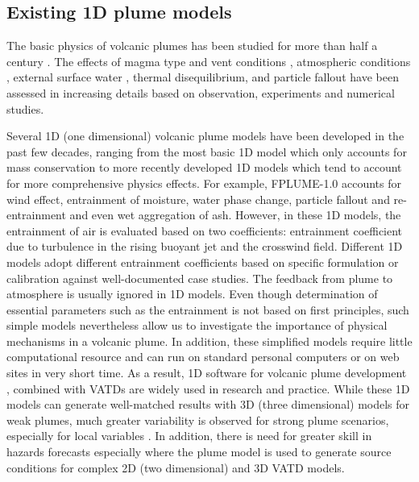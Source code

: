 \subsection{Existing 1D plume models}
The basic physics of volcanic plumes has been studied for more than half a century \citep{morton1956turbulent, settle1978volcanic, wilson1978control}. The effects of magma type and vent conditions \citep{woods1988fluid, woods1995decompression}, atmospheric conditions \citep{ woods1993moist, sparks1997volcanic, bursik2001effect}, external surface water \citep{koyaguchi1996formation}, thermal disequilibrium, and particle fallout \citep{woods1991particle} have been assessed in increasing details based on observation, experiments and numerical studies.

Several 1D (one dimensional) volcanic plume models have been developed in the past few decades, ranging from the most basic 1D model \citep{woods1988fluid} which only accounts for mass conservation to more recently developed 1D models  \citep{bursik2001effect, mastin2007user, degruyter2012improving, woodhouse2013interaction, devenish2013using, girault2014effect, de2015plume, vitturi2015plume, folch2016fplume, pouget2016sensitivity} which tend to account for more comprehensive physics effects. 
For example, FPLUME-1.0 \citep{folch2016fplume} accounts for wind effect, entrainment of moisture, water phase change, particle fallout and re-entrainment and even wet aggregation of ash. However, in these 1D models, the entrainment of air is evaluated based on two coefficients: entrainment coefficient due to turbulence in the rising buoyant jet and the crosswind field. Different 1D models adopt different entrainment coefficients based on specific formulation or calibration against well-documented case studies. The feedback from plume to atmosphere is usually ignored in 1D models. Even though determination of essential parameters such as the entrainment is not based on first principles, such simple models nevertheless allow us to investigate the importance of physical mechanisms in a volcanic plume. In addition, these simplified models require little computational resource and can run on standard personal computers or on web sites in very short time. As a result, 1D software for volcanic plume development \citep[such as][]{267, 1194, 3541}, combined with VATDs \citep[such as][]{114} are widely used in research and practice. While these 1D models can generate well-matched results with 3D (three dimensional) models for weak plumes, much greater variability is observed for strong plume scenarios, especially for local variables \citep{costa2016results}. In addition, there is need for greater skill in hazards forecasts especially where the plume model is used to generate source conditions for complex 2D (two dimensional) and 3D VATD models.

